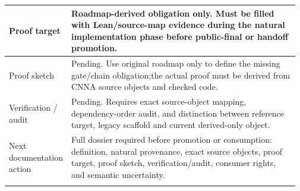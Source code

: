 \begin{longtable}{L{0.16\linewidth} L{0.81\linewidth}}
Proof target & Roadmap-derived obligation only. Must be filled with Lean/\allowbreak{}source-map evidence during the natural implementation phase before public-final or handoff promotion.\\
\hline\addlinespace[0.20em]
Proof sketch & Pending. Use original roadmap only to define the missing gate/\allowbreak{}chain obligation;\newline the actual proof must be derived from CNNA source objects and checked code.\\
\hline\addlinespace[0.20em]
Verification /\allowbreak{} audit & Pending. Requires exact source-object mapping, dependency-order audit, and distinction between reference target, legacy scaffold and current derived-only object.\\
\hline\addlinespace[0.20em]
Next documentation action & Full dossier required before promotion or consumption: definition, natural provenance, exact source objects, proof target, proof sketch, verification/\allowbreak{}audit, consumer rights, and semantic uncertainty.\\
\hline\addlinespace[0.20em]
\end{longtable}
